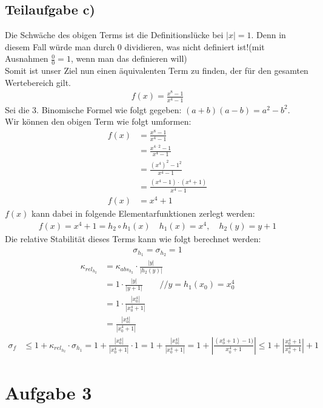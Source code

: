 \documentclass{llncs}
\begin{document}
\subsection*{Teilaufgabe c)}
Die Schwäche des obigen Terms ist die Definitionslücke bei $|x|=1$. Denn in diesem Fall würde man durch $0$ dividieren, was nicht definiert ist!(mit Ausnahmen $\frac{0}{0}=1$, wenn man das definieren will)\\
Somit ist unser Ziel nun einen äquivalenten Term zu finden, der für den gesamten Wertebereich gilt.\\
\begin{align*}
f(x)=\frac{x^8-1}{x^4-1} 
\end{align*}
Sei die 3. Binomische Formel wie folgt gegeben: $(a+b)(a-b)=a^2-b^2$.\\
Wir können den obigen Term wie folgt umformen:
\begin{align*}
f(x)
&=\frac{x^8-1}{x^4-1}\\ 
&=\frac{x^{4\cdot 2}-1}{x^4-1}\\
&=\frac{(x^{4})^2-1^2}{x^4-1}\\
&=\frac{(x^{4}-1)\cdot (x^4+1)}{x^4-1}\\
f(x)&=x^4+1
\end{align*}
$f(x)$ kann dabei in folgende Elementarfunktionen zerlegt werden: \begin{align*}
f(x)=x^4+1= h_2\circ h_1 (x) \quad h_1(x)=x^4,\quad  h_2(y)=y+1 
\end{align*}
Die relative Stabilität dieses Terms kann wie folgt berechnet werden:
\begin{align*}
\sigma_{h_1}=\sigma_{h_2}=1
\end{align*}
\begin{align*}
\kappa_{rel_{h_2}}
&= \kappa_{abs_{h_2}} \cdot \frac{|y|}{|h_2(y)|}\\
&= 1 \cdot \frac{|y|}{|y+1|}\quad\quad // y=h_1(x_0)=x_0^4 \\
&= 1 \cdot \frac{|x_0^4|}{|x_0^4+1|}\\
&= \frac{|x_0^4|}{|x_0^4+1|}
\end{align*}
\begin{align*}
\sigma_{f}
&\le 1 + \kappa_{rel_{h_2}} \cdot \sigma_{h_1}
= 1 + \frac{|x_0^4|}{|x_0^4+1|} \cdot 1 
= 1 + \frac{|x_0^4|}{|x_0^4+1|} 
= 1 +\left|\frac{(x_0^4+1)-1)}{x_0^4+1}\right| \le 1+ \left| \frac{x_0^4+1}{x_0^4+1}\right| +1
\end{align*}
\newpage
\section*{Aufgabe 3}
\end{document}
